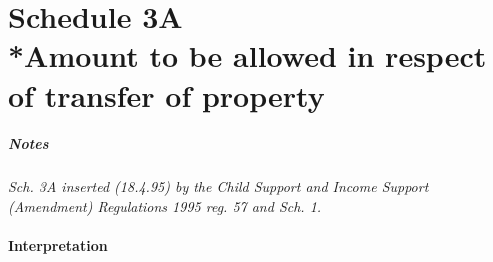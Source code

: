 \documentclass[a4paper]{article}
\newcommand{\parthead}{}
\newcommand\amendment[1]{\subsubsection*{Notes}{\itshape\frenchspacing\footnotesize #1 \par\goodbreak}}
\begin{document}
\part[Schedule 3A --- Amount to be allowed in respect of transfer of property]{Schedule 3A\\*Amount to be allowed in respect of transfer of property}

\renewcommand\parthead{--- Schedule 3A}

\amendment{
Sch. 3A inserted (18.4.95) by the Child Support and Income Support (Amendment) Regulations 1995 reg. 57 and Sch. 1.
}

\subsection*{Interpretation}
\end{document}
